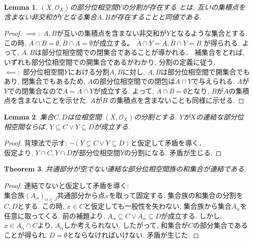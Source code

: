 \documentclass[lualatex]{ltjsbook}
\newcommand{\cl}[1]{\overline{ #1}  }
\newtheorem{theorem}{Theorem}[chapter]
\newtheorem{lemma}[theorem]{Lemma}
\theoremstyle{remark}
\theoremstyle{plain}
\begin{document}
\begin{lemma}
$(X,  \mathcal{O}_X)$の部分位相空間$Y$の分割が存在する
とは,  互いの集積点を含まない非交和が$Y$となる集合$A, B$が存在することと同値である.
\end{lemma}

\begin{proof}
	$\implies:$ $A, B$が互いの集積点を含まない非交和が$Y$となるような集合とする. 
	この時,  $ \cl{A} \cap B = \emptyset,  \cl{B} \cap A = \emptyset$が成立する。
	$\cl{A} \cap Y = A,  \cl{B} \cap Y = B$ が得られる.
	よって,  $A, B$は部分位相空間での閉集合であることが導かれる．
	補集合をとれば,  いずれも部分位相空間での開集合であるがわかり,  分割の定義に従う.\\
	$\impliedby:$ 部分位相空間$Y$における分割$A, B$に対し,  $A, B$は部分位相空間で開集合でもあり,  
	閉集合でもあるため,  $A$の部分位相空間での閉包は$\cl{A} \cap Y$で与えられる. 
	$A$が$Y$での閉集合なので$A = \cl{A} \cap Y$が成立する. 
	よって,  $\cl{A} \cap B = \emptyset$となり,  $B$が$A$の集積点を含まないことを示せた. 
	$A$が$B$ の集積点を含まないことも同様に示せる.
\end{proof}

\begin{lemma}
	集合$C, D$は位相空間 $(X, \mathcal{O}_X)$の分割とする. $Y$が$X$の連結な部分位相空間ならば,  $Y \subseteq C \lor Y \subseteq D$が成立する.
\end{lemma}
 
\begin{proof}
	背理法で示す: $ \lnot (Y \subseteq C \lor Y \subseteq D)$と仮定して矛盾を導く．\\
	仮定より,  $Y \cap C,  Y\cap D$が部分位相空間$Y$の分割になる. 矛盾が生じる.
\end{proof}

\begin{theorem}
	共通部分が空でない連結な部分位相空間族の和集合が連結である.
\end{theorem}

\begin{proof}
	連結でないと仮定して矛盾を導く:\\
	集合族$\left( A_{\alpha} \right) _{\alpha \in J}$共通部分から点$x$を取って固定する.
	集合族の和集合の分割を$C, D$とする.
	この時,  $x \in C$と仮定しても一般性を失わない,  集合族から集合$A_{\alpha}$を任意に取ってくる.
	前の補題より,  $A_{\alpha} \subseteq C \lor A_{\alpha} \subseteq D$が成立する. 
	しかし,  $x \in A_{\alpha} \cap C$より,  $A_{\alpha}$しか考えられない. 
	したがって,  和集合が$C$の部分集合であることが得られ,  $D = \emptyset$とならなければいけない. 
	矛盾が生じた.
\end{proof}
\end{document}
